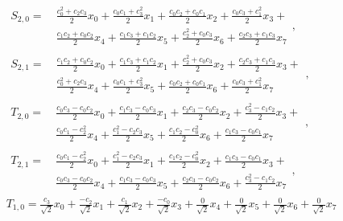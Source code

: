 \begin{gather}
\begin{split}
S_{2,0} =~
	& \frac{c_{0}^{2} + c_{2} c_{3}}{2} x_{0} + \frac{c_{0} c_{1} + c_{3}^{2}}{2} x_{1} + \frac{c_{0} c_{2} + c_{0} c_{1}}{2} x_{2} + \frac{c_{0} c_{3} + c_{1}^{2}}{2} x_{3} + \\
	& \frac{c_{1} c_{2} + c_{0} c_{2}}{2} x_{4} + \frac{c_{1} c_{3} + c_{1} c_{2}}{2} x_{5} + \frac{c_2^{2} + c_{0} c_{3}}{2} x_{6} + \frac{c_{2} c_{3} + c_{1} c_{3}}{2} x_7
\end{split}
\label{eq:db2_outvect_s_2_0_full}, \\
\begin{split}
S_{2,1} =~
	& \frac{c_{1} c_{2} + c_{0} c_{2}}{2} x_{0} + \frac{c_{1} c_{3} + c_{1} c_{2}}{2} x_{1} + \frac{c_2^{2} + c_{0} c_{3}}{2} x_{2} + \frac{c_{2} c_{3} + c_{1} c_{3}}{2} x_{3} + \\
	& \frac{c_0^{2} + c_{2} c_{3}}{2} x_{4} + \frac{c_{0} c_{1} + c_3^{2}}{2} x_{5} + \frac{c_{0} c_{2} + c_{0} c_{1}}{2} x_{6} + \frac{c_{0} c_{3} + c_1^{2}}{2} x_7
\end{split}
\label{eq:db2_outvect_s_2_1_full}, \\
\begin{split}
T_{2,0} =~
	& \frac{c_{0} c_{3} - c_{0} c_{2}}{2} x_{0} + \frac{c_{1} c_{3} - c_{0} c_{3}}{2} x_{1} + \frac{c_{2} c_{3} - c_{0} c_{2}}{2} x_{2} + \frac{c_3^{2} - c_{1} c_{2}}{2} x_{3} + \\
	& \frac{c_{0} c_{1} - c_2^{2}}{2} x_{4} + \frac{c_1^{2} - c_{2} c_{3}}{2} x_{5} + \frac{c_{1} c_{2} - c_0^{2}}{2} x_{6} + \frac{c_{1} c_{3} - c_{0} c_{1}}{2} x_7
\end{split}
\label{eq:db2_outvect_t_2_0_full}, \\
\begin{split}
T_{2,1} =~
	& \frac{c_{0} c_{1} - c_2^{2}}{2} x_{0} + \frac{c_1^{2} - c_{2} c_{3}}{2} x_{1} + \frac{c_{1} c_{2} - c_0^{2}}{2} x_{2} + \frac{c_{1} c_{3} - c_{0} c_{1}}{2} x_{3} + \\
	& \frac{c_{0} c_{3} - c_{0} c_{2}}{2} x_{4} + \frac{c_{1} c_{3} - c_{0} c_{3}}{2} x_{5} + \frac{c_{2} c_{3} - c_{0} c_{2}}{2} x_{6} + \frac{c_3^{2} - c_{1} c_{2}}{2} x_7
\end{split}
\label{eq:db2_outvect_t_2_1_full}, \\
T_{1,0} =
	\frac{c_{3}}{\sqrt{2}} x_{0} + \frac{- c_{2}}{\sqrt{2}} x_{1} + \frac{c_{1}}{\sqrt{2}} x_{2} + \frac{- c_{0}}{\sqrt{2}} x_{3} +
	\frac{0}{\sqrt{2}} x_{4} + \frac{0}{\sqrt{2}} x_{5} + \frac{0}{\sqrt{2}} x_{6} + \frac{0}{\sqrt{2}} x_{7}

\end{gather}
